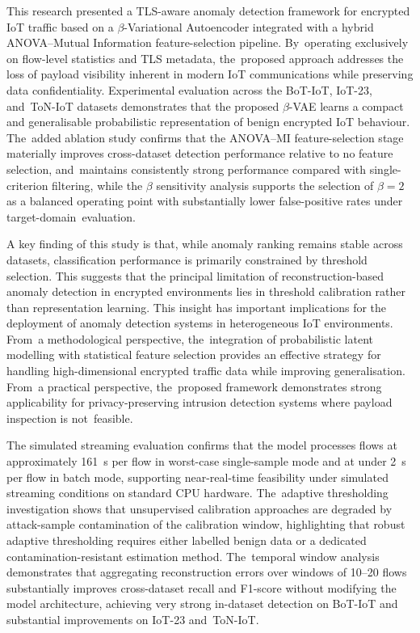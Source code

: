 \documentclass[futureinternet,article,accept,moreauthors]{Definitions/mdpi}
\begin{document}
This research presented a TLS-aware anomaly detection framework for encrypted IoT traffic based on a $\beta$-Variational Autoencoder integrated with a hybrid ANOVA--Mutual Information feature-selection pipeline. By~operating exclusively on flow-level statistics and TLS metadata, the~proposed approach addresses the loss of payload visibility inherent in modern IoT communications while preserving data confidentiality. Experimental evaluation across the BoT-IoT, IoT-23, and~ToN-IoT datasets demonstrates that the proposed $\beta$-VAE learns a compact and generalisable probabilistic representation of benign encrypted IoT behaviour. The~added ablation study confirms that the ANOVA--MI feature-selection stage materially improves cross-dataset detection performance relative to no feature selection, and~maintains consistently strong performance compared with single-criterion filtering, while the $\beta$ sensitivity analysis supports the selection of $\beta=2$ as a balanced operating point with substantially lower false-positive rates under target-domain~evaluation.

A key finding of this study is that, while anomaly ranking remains stable across datasets, classification performance is primarily constrained by threshold selection. This suggests that the principal limitation of reconstruction-based anomaly detection in encrypted environments lies in threshold calibration rather than representation learning. This insight has important implications for the deployment of anomaly detection systems in heterogeneous IoT environments. From~a methodological perspective, the~integration of probabilistic latent modelling with statistical feature selection provides an effective strategy for handling high-dimensional encrypted traffic data while improving generalisation. From~a practical perspective, the~proposed framework demonstrates strong applicability for privacy-preserving intrusion detection systems where payload inspection is not~feasible.

The simulated streaming evaluation confirms that the model processes flows at approximately 161~\textmu s per flow in worst-case single-sample mode and at under 2~\textmu s per flow in batch mode, supporting near-real-time feasibility under simulated streaming conditions on standard CPU hardware. The~adaptive thresholding investigation shows that unsupervised calibration approaches are degraded by attack-sample contamination of the calibration window, highlighting that robust adaptive thresholding requires either labelled benign data or a dedicated contamination-resistant estimation method. The~temporal window analysis demonstrates that aggregating reconstruction errors over windows of 10--20 flows substantially improves cross-dataset recall and F1-score without modifying the model architecture, achieving very strong in-dataset detection on BoT-IoT and substantial improvements on IoT-23 and~ToN-IoT.
\end{document}

